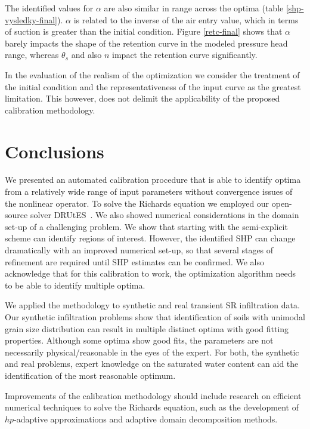 \documentclass[review,times,3p,10pt]{elsarticle}
\begin{document}
The identified values for $\alpha$ are also similar in range across the optima (table \ref{shp-vysledky-final}). $\alpha$ is related to the inverse of the air entry value, which in terms of suction is greater than the initial condition. Figure \ref{retc-final} shows that $\alpha$ barely impacts the shape of the retention curve in the modeled pressure head range, whereas $\theta_s$ and also $n$ impact the retention curve significantly. 

In the evaluation of the realism of the optimization we consider the treatment of the initial condition and the representativeness of the input curve as the greatest limitation. This however, does not delimit the applicability of the proposed calibration methodology. 

 

\section{Conclusions}
\bigskip

We presented an automated calibration procedure that is able to identify optima from a relatively wide range of input parameters without convergence issues of the nonlinear operator. To solve the Richards equation we employed our open-source solver DRUtES~\citep{drutes}. We also showed numerical considerations in the domain set-up of a challenging problem. We show that starting with the semi-explicit scheme can identify regions of interest. However, the identified SHP can change dramatically with an improved numerical set-up, so that several stages of refinement are required until SHP estimates can be confirmed. We also acknowledge that for this calibration to work, the optimization algorithm needs to be able to identify multiple optima. 

We applied the methodology to synthetic and real transient SR infiltration data. Our synthetic infiltration problems show that identification of soils with unimodal grain size distribution can result in multiple distinct optima with good fitting properties. Although some optima show good fits, the parameters are not necessarily physical/reasonable in the eyes of the expert. For both, the synthetic and real problems, expert knowledge on the saturated water content can aid the identification of the most reasonable optimum. 

Improvements of the calibration methodology should include research on efficient numerical techniques to solve the Richards equation, such as the development of $hp$-adaptive approximations and adaptive domain decomposition  methods.
\end{document}
